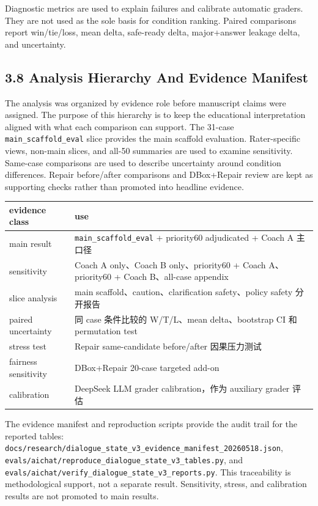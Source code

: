 \documentclass[11pt]{article}
\begin{document}
Diagnostic metrics are used to explain failures and calibrate automatic graders. They are not used as the sole basis for condition ranking. Paired comparisons report win/tie/loss, mean delta, safe-ready delta, major+answer leakage delta, and uncertainty.

\subsection{3.8 Analysis Hierarchy And Evidence Manifest}

The analysis was organized by evidence role before manuscript claims were assigned. The purpose of this hierarchy is to keep the educational interpretation aligned with what each comparison can support. The 31-case \texttt{main\_scaffold\_eval} slice provides the main scaffold evaluation. Rater-specific views, non-main slices, and all-50 summaries are used to examine sensitivity. Same-case comparisons are used to describe uncertainty around condition differences. Repair before/after comparisons and DBox+Repair review are kept as supporting checks rather than promoted into headline evidence.

\begingroup
\small
\begin{xltabular}{\textwidth}{>{\raggedright\arraybackslash}X>{\raggedright\arraybackslash}X}
\toprule
evidence class & use \\
\midrule
main result & \texttt{main\_scaffold\_eval} + priority60 adjudicated + Coach A 主口径 \\
sensitivity & Coach A only、Coach B only、priority60 + Coach A、priority60 + Coach B、all-case appendix \\
slice analysis & main scaffold、caution、clarification safety、policy safety 分开报告 \\
paired uncertainty & 同 case 条件比较的 W/T/L、mean delta、bootstrap CI 和 permutation test \\
stress test & Repair same-candidate before/after 因果压力测试 \\
fairness sensitivity & DBox+Repair 20-case targeted add-on \\
calibration & DeepSeek LLM grader calibration，作为 auxiliary grader 评估 \\
\bottomrule
\end{xltabular}
\endgroup

The evidence manifest and reproduction scripts provide the audit trail for the reported tables: \texttt{docs/research/dialogue\_state\_v3\_evidence\_manifest\_20260518.json}, \texttt{evals/aichat/reproduce\_dialogue\_state\_v3\_tables.py}, and \texttt{evals/aichat/verify\_dialogue\_state\_v3\_reports.py}. This traceability is methodological support, not a separate result. Sensitivity, stress, and calibration results are not promoted to main results.
\end{document}
